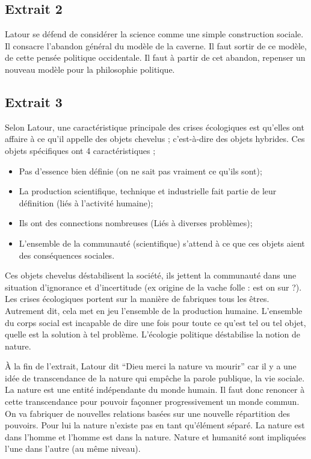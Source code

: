 \documentclass[11pt,a4paper]{article} %
\begin{document}
\subsection{Extrait 2}

Latour se défend de considérer la science comme une simple construction sociale.
Il consacre l'abandon général du modèle de la caverne.
Il faut sortir de ce modèle, de cette pensée politique occidentale.
Il faut à partir de cet abandon, repenser un nouveau modèle pour la philosophie politique.

\subsection{Extrait 3}

Selon Latour, une caractéristique principale des crises écologiques est qu'elles ont affaire à ce qu'il appelle des objets chevelus ; c'est-à-dire des objets hybrides.
Ces objets spécifiques ont 4 caractéristiques ;
\begin{itemize}
	\item Pas d'essence bien définie (on ne sait pas vraiment ce qu'ils sont);
	\item La production scientifique, technique et industrielle fait partie de leur définition (liés à l'activité humaine);
	\item Ils ont des connections nombreuses (Liés à diverses problèmes);
	\item L'ensemble de la communauté (scientifique) s'attend à ce que ces objets aient des conséquences sociales.
\end{itemize}
Ces objets chevelus déstabilisent la société, ils jettent la communauté dans une situation d'ignorance et d'incertitude (ex origine de la vache folle : est on sur ?).
Les crises écologiques portent sur la manière de fabriques tous les êtres.
Autrement dit, cela met en jeu l'ensemble de la production humaine.
L'ensemble du corps social est incapable de dire une fois pour toute ce qu'est tel ou tel objet, quelle est la solution à tel problème.
L'écologie politique déstabilise la notion de nature.

À la fin de l'extrait, Latour dit  ``Dieu merci la nature va mourir'' car il y a une idée de transcendance de la nature qui empêche la parole publique, la vie sociale.
La nature est une entité indépendante du monde humain.
Il faut donc renoncer à cette transcendance pour pouvoir façonner progressivement un monde commun.
On va fabriquer de nouvelles relations basées sur une nouvelle répartition des pouvoirs.
Pour lui la nature n'existe pas en tant qu'élément séparé.
La nature est dans l'homme et l'homme est dans la nature.
Nature et humanité sont impliquées l'une dans l'autre (au même niveau).
\end{document}
